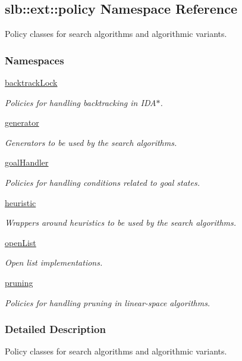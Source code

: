 \hypertarget{namespaceslb_1_1ext_1_1policy}{}\subsection{slb\+:\+:ext\+:\+:policy Namespace Reference}
\label{namespaceslb_1_1ext_1_1policy}


Policy classes for search algorithms and algorithmic variants.  


\subsubsection*{Namespaces}
\begin{DoxyCompactItemize}
\item 
 \hyperlink{namespaceslb_1_1ext_1_1policy_1_1backtrackLock}{backtrack\+Lock}
\begin{DoxyCompactList}\small\item\em Policies for handling backtracking in I\+D\+A$\ast$. \end{DoxyCompactList}\item 
 \hyperlink{namespaceslb_1_1ext_1_1policy_1_1generator}{generator}
\begin{DoxyCompactList}\small\item\em Generators to be used by the search algorithms. \end{DoxyCompactList}\item 
 \hyperlink{namespaceslb_1_1ext_1_1policy_1_1goalHandler}{goal\+Handler}
\begin{DoxyCompactList}\small\item\em Policies for handling conditions related to goal states. \end{DoxyCompactList}\item 
 \hyperlink{namespaceslb_1_1ext_1_1policy_1_1heuristic}{heuristic}
\begin{DoxyCompactList}\small\item\em Wrappers around heuristics to be used by the search algorithms. \end{DoxyCompactList}\item 
 \hyperlink{namespaceslb_1_1ext_1_1policy_1_1openList}{open\+List}
\begin{DoxyCompactList}\small\item\em Open list implementations. \end{DoxyCompactList}\item 
 \hyperlink{namespaceslb_1_1ext_1_1policy_1_1pruning}{pruning}
\begin{DoxyCompactList}\small\item\em Policies for handling pruning in linear-\/space algorithms. \end{DoxyCompactList}\end{DoxyCompactItemize}


\subsubsection{Detailed Description}
Policy classes for search algorithms and algorithmic variants. 